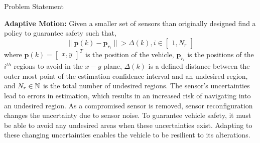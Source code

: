 \begin{section}{Problem Statement}
\begin{problem} \label{problem2} {\textbf{Adaptive Motion:}} 
Given a smaller set of sensors than originally designed find a policy to guarantee safety such that,
	\begin{equation}
		\lVert {\bm{p}(k)-\bm{p}_{r_i}} \rVert >\Delta(k),  i \in \begin{bmatrix} 1,N_r \end{bmatrix}
	\end{equation}
where $\bm{p}(k)={\begin{bmatrix} x,y \end{bmatrix}}^T$ is the position of the vehicle, $\bm{p}_{r_i}$ is the positions of the ${i}^{th}$ regions to avoid in the $x-y$ plane, $\Delta(k)$ is a defined distance between the outer most point of the estimation confidence interval and an undesired region, and $N_r \in \mathbb{N}$ is the total number of undesired regions. The sensor's uncertainties lead to errors in estimation, which results in an increased risk of navigating into an undesired region. As a compromised sensor is removed, sensor reconfiguration changes the uncertainty due to sensor noise. To guarantee vehicle safety, it must be able to avoid any undesired areas when these uncertainties exist. Adapting to these changing uncertainties enables the vehicle to be resilient to its alterations.


	
\end{problem}

\end{section}